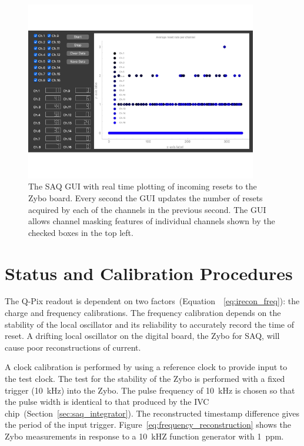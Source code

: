 \begin{figure}[]
\centering
\includegraphics[width=0.9\textwidth]{images/SAQ_gui_resets.pdf}
\caption{The SAQ GUI with real time plotting of incoming resets to the Zybo board.
Every second the GUI updates the number of resets acquired by each of the channels in the previous second.
The GUI allows channel masking features of individual channels shown by the checked boxes in the top left.
}
\label{fig:saq_gui}
\end{figure}

\section{Status and Calibration Procedures}
\label{sec:saq_calib}
The Q-Pix readout is dependent on two factors~(Equation~~\ref{eq:irecon_freq}): the charge and frequency calibrations.
The frequency calibration depends on the stability of the local oscillator and its reliability to accurately record the time of reset.
A drifting local oscillator on the digital board, the Zybo for SAQ, will cause poor reconstructions of current.

A clock calibration is performed by using a reference clock to provide input to the test clock.
The test for the stability of the Zybo is performed with a fixed trigger (10~\unit{kHz}) into the Zybo.
The pulse frequency of 10~\unit{kHz} is chosen so that the pulse width is identical to that produced by the IVC chip~(Section~\ref{sec:saq_integrator}).
The reconstructed timestamp difference gives the period of the input trigger.
Figure~\ref{eq:frequency_reconstruction} shows the Zybo measurements in response to a 10~\unit{kHZ} function generator with 1~\unit{ppm}.

